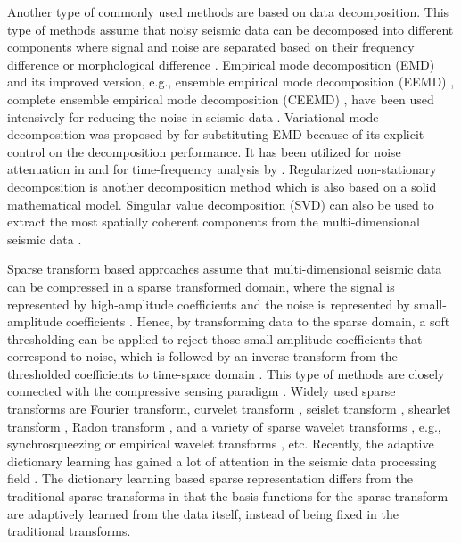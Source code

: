 Another type of commonly used methods are based on data decomposition. This type of methods assume that noisy seismic data can be decomposed into different components where signal and noise are separated based on their frequency difference or morphological difference \cite[]{weilin2017gji}. Empirical mode decomposition (EMD) \cite[]{huangemd,yangkang2016emd} and its improved version, e.g., ensemble empirical mode decomposition (EEMD) \cite[]{eemd},  complete ensemble empirical mode decomposition (CEEMD) \cite[]{epsceemd}, have been used intensively for reducing the noise in seismic data \cite[]{chenwei2016seg}. Variational mode decomposition was proposed by \cite{vmd2014} for substituting EMD because of its explicit control on the decomposition performance. It has been utilized  for noise attenuation in \cite{liu2017application} and for time-frequency analysis by \cite{liuwei2016vmd}.  Regularized non-stationary decomposition \cite[]{wencheng2014,guoning2016seg} is another decomposition method which is also based on a solid mathematical model. Singular value decomposition (SVD) can also be used to extract the most spatially coherent components from the multi-dimensional seismic data \cite[]{amir2017grsl}. 

Sparse transform based approaches assume that multi-dimensional seismic data can be compressed in a sparse transformed domain, where the signal is represented by high-amplitude coefficients and the noise is represented by small-amplitude coefficients \cite[]{gholami2013,baimin2018jse2}. Hence, by transforming data to the sparse domain, a soft thresholding can be applied to reject those small-amplitude coefficients that correspond to noise, which is followed by an inverse transform from the thresholded coefficients to time-space domain \cite[]{yangkang2017sgk}.  This type of methods are closely connected with the compressive sensing paradigm \cite[]{lorenzi2016}. Widely used sparse transforms are Fourier transform, curvelet transform \cite[]{candes20061,herrmann2007non,herrmann2008non,yanfei2011,shaohuan2017gji}, seislet transform \cite[]{fomel2010seislet,yangkang2015eseis,shuwei2015seg1,shuwei2015seg2}, shearlet transform \cite[]{jseshearlet2016}, Radon transform \cite[]{foster1992}, and a variety of sparse wavelet transforms \cite[]{mostafa2016bssa,amir2017ieee}, e.g., synchrosqueezing \cite[]{daubechies2011,mostafa2016geo,mostafa2016jag,mostafa2017geo} or empirical wavelet transforms \cite[]{liuwei2016ewt}, etc. Recently, the adaptive dictionary learning has gained a lot of attention in the seismic data processing field \cite[]{yangkang2017sgk,wujuan2018jge2}.  The dictionary learning based sparse representation differs from the traditional sparse transforms in that the basis functions for the sparse transform are adaptively learned from the data itself, instead of being fixed in the traditional transforms.

